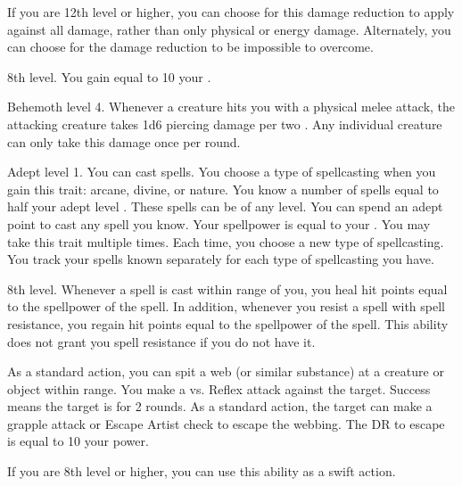     If you are 12th level or higher, you can choose for this damage reduction to apply against all damage, rather than only physical or energy damage.
    Alternately, you can choose for the damage reduction to be impossible to overcome.

    \featpre 8th level.
    \featben You gain  equal to 10 \add your .

    \featpre Behemoth level 4.
    \featben Whenever a creature hits you with a physical melee attack, the attacking creature takes 1d6 piercing damage per two .
    Any individual creature can only take this damage once per round.

    \featpre Adept level 1.
    \featben You can cast spells.
    You choose a type of spellcasting when you gain this trait: arcane, divine, or nature.
    You know a number of spells equal to half your adept level .
    These spells can be of any level.
    You can spend an adept point to cast any spell you know.
    Your spellpower is equal to your .
     You may take this trait multiple times.
    Each time, you choose a new type of spellcasting.
    You track your spells known separately for each type of spellcasting you have.

    \featpre 8th level.
    \featben Whenever a spell is cast within \rngmed range of you, you heal hit points equal to the spellpower of the spell.
    In addition, whenever you resist a spell with spell resistance, you regain hit points equal to the spellpower of the spell.
    This ability does not grant you spell resistance if you do not have it.

    \featben As a standard action, you can spit a web (or similar substance) at a creature or object within \rngmed range.
    You make a  vs. Reflex attack against the target.
    Success means the target is \immobilized for 2 rounds.
    As a standard action, the target can make a grapple attack or Escape Artist check to escape the webbing.
    The DR to escape is equal to 10 \add your power.

    If you are 8th level or higher, you can use this ability as a swift action.

